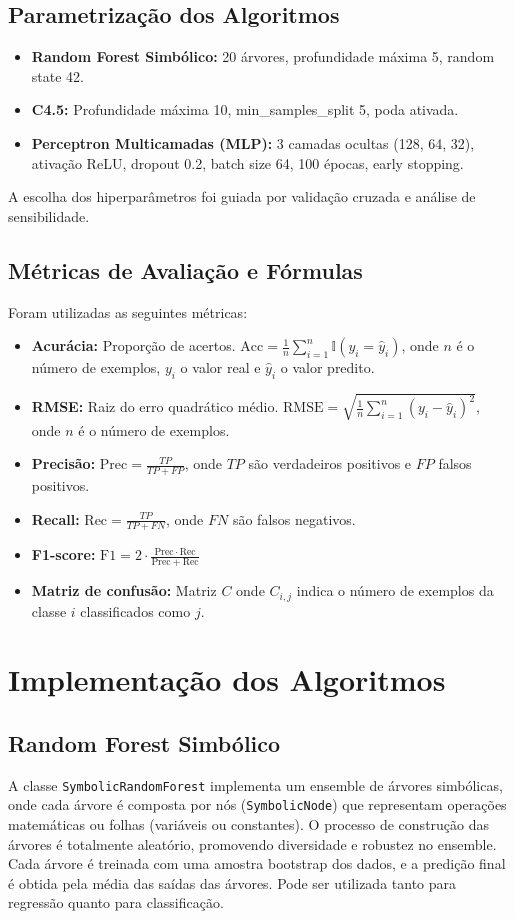 \documentclass[11pt]{article}
\begin{document}
\subsection{Parametrização dos Algoritmos}
\begin{itemize}
    \item \textbf{Random Forest Simbólico:} 20 árvores, profundidade máxima 5, random state 42.
    \item \textbf{C4.5:} Profundidade máxima 10, min\_samples\_split 5, poda ativada.
    \item \textbf{Perceptron Multicamadas (MLP):} 3 camadas ocultas (128, 64, 32), ativação ReLU, dropout 0.2, batch size 64, 100 épocas, early stopping.
\end{itemize}
A escolha dos hiperparâmetros foi guiada por validação cruzada e análise de sensibilidade.

\subsection{Métricas de Avaliação e Fórmulas}
Foram utilizadas as seguintes métricas:
\begin{itemize}
    \item \textbf{Acurácia:} Proporção de acertos. $\mathrm{Acc} = \frac{1}{n} \sum_{i=1}^n \mathbb{I}(y_i = \hat{y}_i)$, onde $n$ é o número de exemplos, $y_i$ o valor real e $\hat{y}_i$ o valor predito.
    \item \textbf{RMSE:} Raiz do erro quadrático médio. $\mathrm{RMSE} = \sqrt{\frac{1}{n} \sum_{i=1}^n (y_i - \hat{y}_i)^2}$, onde $n$ é o número de exemplos.
    \item \textbf{Precisão:} $\mathrm{Prec} = \frac{TP}{TP + FP}$, onde $TP$ são verdadeiros positivos e $FP$ falsos positivos.
    \item \textbf{Recall:} $\mathrm{Rec} = \frac{TP}{TP + FN}$, onde $FN$ são falsos negativos.
    \item \textbf{F1-score:} $\mathrm{F1} = 2 \cdot \frac{\mathrm{Prec} \cdot \mathrm{Rec}}{\mathrm{Prec} + \mathrm{Rec}}$
    \item \textbf{Matriz de confusão:} Matriz $C$ onde $C_{i,j}$ indica o número de exemplos da classe $i$ classificados como $j$.
\end{itemize}

\section{Implementação dos Algoritmos}
\subsection{Random Forest Simbólico}
A classe \texttt{SymbolicRandomForest} implementa um ensemble de árvores simbólicas, onde cada árvore é composta por nós (\texttt{SymbolicNode}) que representam operações matemáticas ou folhas (variáveis ou constantes). O processo de construção das árvores é totalmente aleatório, promovendo diversidade e robustez no ensemble. Cada árvore é treinada com uma amostra bootstrap dos dados, e a predição final é obtida pela média das saídas das árvores. Pode ser utilizada tanto para regressão quanto para classificação.
\end{document}
